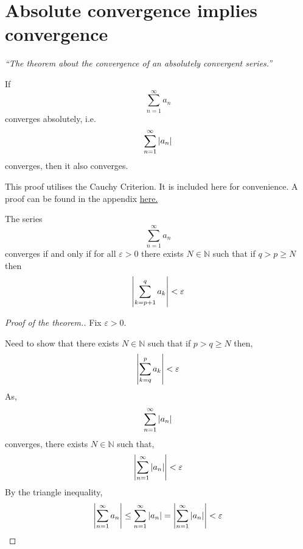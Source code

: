 \documentclass[12pt]{report}
\begin{document}
    \section{Absolute convergence implies convergence}
    \textit{``The theorem about the convergence of an absolutely convergent series.''} \vspace{3mm}
    \begin{theorem}
        If
        \[\sum^\infty_{n=1} a_n\]
        converges absolutely, i.e.
        \[\sum^\infty_{n=1} \left| a_n \right|\]
        converges, then it also converges.
    \end{theorem}
    This proof utilises the Cauchy Criterion. It is included here for convenience. A proof can be found in the appendix \hyperref[Cauchy Criterion]{here.} \vspace{3mm}
    \begin{claim}
        The series
        \[\sum^\infty_{n=1} a_n\] 
        converges if and only if for all \(\varepsilon >0\) there exists \(N \in\mathbb{N}\) such that if \(q> p \geq N\) then
        \[\left| \sum^q_{k=p+1} a_k \right| < \varepsilon\]
    \end{claim}
    \begin{proof}[Proof of the theorem.]
        Fix \(\varepsilon > 0\). 
        
        Need to show that there exists \(N \in \mathbb{N}\) such that if \(p > q \geq N\) then,
        \[\left| \sum^p_{k=q} a_k \right| < \varepsilon\]
        As,
        \[\sum^\infty_{n=1} \left| a_n \right|\]
        converges, there exists \(N \in \mathbb{N}\) such that,
        \[\left| \sum^\infty_{n=1} \left| a_n \right| \right| < \varepsilon\]
        By the triangle inequality,
        \[\left| \sum^\infty_{n=1} a_n \right| \leq \sum^\infty_{n=1} \left| a_n \right| = \left| \sum^\infty_{n=1} \left| a_n \right| \right| < \varepsilon\]
    \end{proof}
    \setcounter{section}{25}
\end{document}
